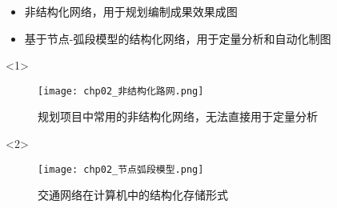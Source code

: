 \begin{frame}[t]{\subsecname}
\begin{itemize}
\item<1-> 非结构化网络，用于规划编制成果效果成图
\item<2-> 基于节点-弧段模型的结构化网络，用于定量分析和自动化制图
\end{itemize}

\begin{overlayarea}{\textwidth}{\textheight}
  \begin{onlyenv}<1>
\begin{figure}
  \centering
  \texttt{[image: chp02\_非结构化路网.png]}
  \caption{规划项目中常用的非结构化网络，无法直接用于定量分析}
\end{figure}
  \end{onlyenv}

  \begin{onlyenv}<2>
\begin{figure}\centering
   \texttt{[image: chp02\_节点弧段模型.png]}

\caption{交通网络在计算机中的结构化存储形式}
\end{figure}
  \end{onlyenv}
\end{overlayarea}
\end{frame}

